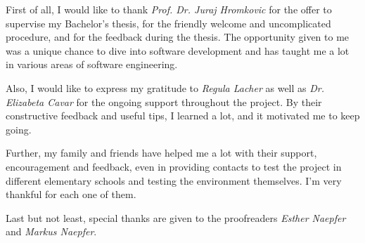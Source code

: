 First of all, I would like to thank \textit{Prof. Dr. Juraj Hromkovic} for the offer to supervise my Bachelor's thesis, for the friendly welcome and uncomplicated procedure, and for the feedback during the thesis. The opportunity given to me was a unique chance to dive into software development and has taught me a lot in various areas of software engineering.

Also, I would like to express my gratitude to \textit{Regula Lacher} as well as \textit{Dr. Elizabeta Cavar} for the ongoing support throughout the project. By their constructive feedback and useful tips, I learned a lot, and it motivated me to keep going. 

Further, my family and friends have helped me a lot with their support, encouragement and feedback, even in providing contacts to test the project in different elementary schools and testing the environment themselves. I'm very thankful for each one of them.

Last but not least, special thanks are given to the proofreaders \textit{Esther Naepfer} and \textit{Markus Naepfer}.